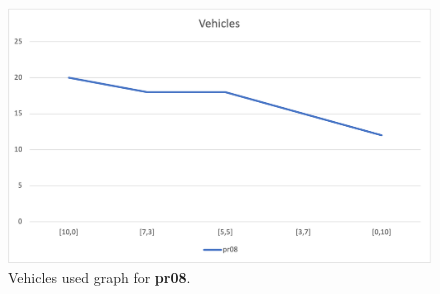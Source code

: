 \begin{figure}[H]
    \centering
    \includegraphics[height=0.25\textheight]{../graphs/pr08-vehicles.png}
    \caption{Vehicles used graph for \textbf{pr08}.}
\end{figure}

\newpage
